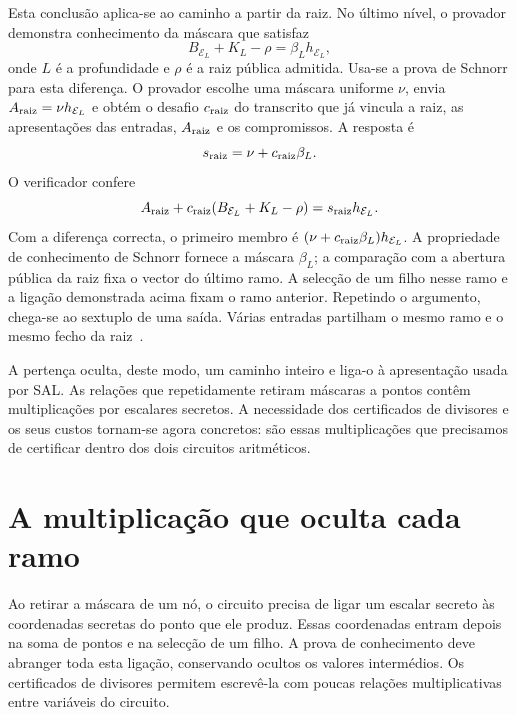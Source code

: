 Esta conclusão aplica-se ao caminho a partir da raiz.
No último nível, o provador demonstra conhecimento da
máscara que satisfaz
\[
 B_{\mathcal E_L}+K_L-\rho=\beta_Lh_{\mathcal E_L},
\]
onde \(L\) é a profundidade e \(\rho\) é a raiz pública
admitida. Usa-se a prova de Schnorr para esta diferença.
O provador escolhe uma máscara uniforme \(\nu\), envia
\(A_{\rm raiz}=\nu h_{\mathcal E_L}\) e obtém o desafio
\(c_{\rm raiz}\) do transcrito que já vincula a raiz,
as apresentações das entradas, \(A_{\rm raiz}\) e os
compromissos. A resposta é
\[
 s_{\rm raiz}=\nu+c_{\rm raiz}\beta_L.
\]
O verificador confere
\begin{equation}
 A_{\rm raiz}+c_{\rm raiz}(B_{\mathcal E_L}+K_L-\rho)
       =s_{\rm raiz}h_{\mathcal E_L}.
 \label{eq:fcmp-root-closure}
\end{equation}
Com a diferença correcta, o primeiro membro é
\((\nu+c_{\rm raiz}\beta_L)h_{\mathcal E_L}\).
A propriedade de conhecimento de Schnorr fornece a máscara
\(\beta_L\); a comparação com a abertura pública da raiz
fixa o vector do último ramo. A selecção de um filho nesse
ramo e a ligação demonstrada acima fixam o ramo anterior.
Repetindo o argumento, chega-se ao sextuplo de uma saída.
Várias entradas partilham o mesmo ramo e o mesmo fecho
da raiz~\cite{monero-oxide-fcmp-source}.

A pertença oculta, deste modo, um caminho inteiro e liga-o
à apresentação usada por SAL. As relações que repetidamente
retiram máscaras a pontos contêm multiplicações por
escalares secretos. A necessidade dos certificados de
divisores e os seus custos tornam-se agora concretos:
são essas multiplicações que precisamos de certificar
dentro dos dois circuitos aritméticos.

\section{A multiplicação que oculta cada ramo}
\label{sec:fcmp-divisor-purpose}

Ao retirar a máscara de um nó, o circuito precisa de ligar
um escalar secreto às coordenadas secretas do ponto que ele
produz. Essas coordenadas entram depois na soma de pontos e
na selecção de um filho. A prova de conhecimento deve abranger
toda esta ligação, conservando ocultos os valores intermédios.
Os certificados de divisores permitem escrevê-la com poucas
relações multiplicativas entre variáveis do circuito.

